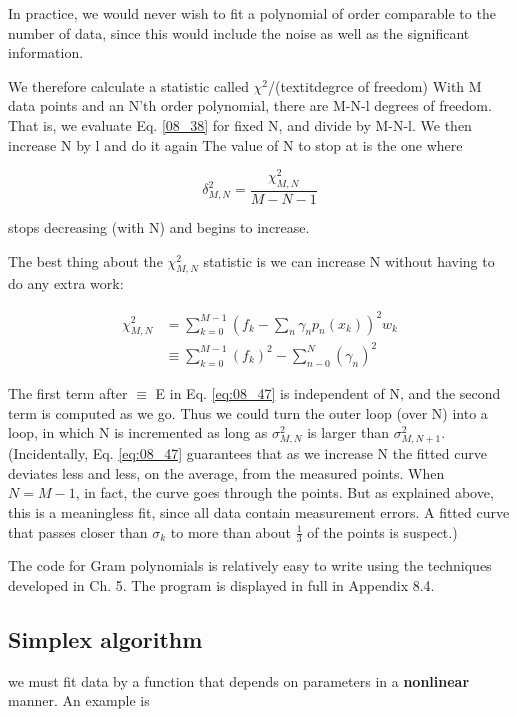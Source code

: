 In practice, we would never wish to fit a polynomial of order comparable to the number of data, since this would include the noise as well as the significant information.

We therefore calculate a statistic called $\chi^{2}$/(textit{degrce of freedom}) With M data points and an N'th order polynomial, there are M-N-l degrees of freedom. That is, we evaluate Eq. \ref{08_38} for fixed N, and divide by M-N-l. We then increase N by l and do it again The value of N to stop at is the one where

\begin{equation*}
\delta_{M,N}^{2} = \frac{\chi_{M,N}^{2}}{M-N-1}
\end{equation*}

stops decreasing (with N) and begins to increase.

The best thing about the $\chi_{M,N}^{2}$ statistic is we can increase N without having to do any extra work:

\begin{equation}\label{eq:08_47}
    \begin{split}
        \chi_{M,N}^{2} &= \sum_{k=0}^{M-1} (f_{k} - \sum_{n} \gamma_{n}p_{n}(x_{k}))^2 w_{k} \\
        &\equiv \sum_{k=0}^{M-1} (f_{k})^{2} - \sum_{n-0}^{N} (\gamma_{n})^2
    \end{split}
\end{equation}

The first term after $\equiv$ E in Eq. \ref{eq:08_47} is independent of N, and the second term is computed as we go. Thus we could turn the outer loop (over N) into a  loop, in which N is incremented as long as $\sigma_{M,N}^{2}$ is larger than $\sigma_{M,N+1}^{2}$. (Incidentally, Eq. \ref{eq:08_47} guarantees that as we increase N the fitted curve deviates less and less, on the average, from the measured points. When $N = M-1$, in fact, the curve goes through the points. But as explained above, this is a meaningless fit, since all data contain measurement errors. A fitted curve that passes closer than $\sigma_{k}$ to more than about $\frac{1}{3}$ of the points is suspect.)

The code for Gram polynomials is relatively easy to write using the techniques developed in Ch. 5. The program is displayed in full in Appendix 8.4.

\subsection{Simplex algorithm}
 we must fit data by a function that depends on parameters in a \textbf{nonlinear} manner. An example is

